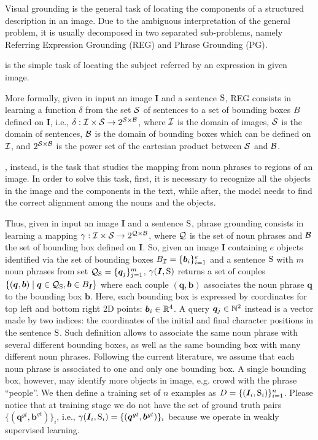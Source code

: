 Visual grounding is the general task of locating the components of a
structured description in an image. Due to the ambiguous
interpretation of the general problem, it is usually decomposed in two
separated sub-problems, namely Referring Expression Grounding (REG)
and Phrase Grounding (PG).

 is the simple task of
locating the subject referred by an expression in given image.

More formally, given in input an image $\bm{I}$ and a sentence
$\mathrm{S}$, REG consists in learning a function $\delta$ from the
set $\mathcal{S}$ of sentences to a set of bounding boxes $B$ defined on
$\bm{I}$, i.e., $\delta: \mathcal{I} \times \mathcal{S} \rightarrow 2^{\mathcal{S}
\times \mathcal{B}}$, where $\mathcal{I}$ is the domain of images, $\mathcal{S}$ is the
domain of sentences, $\mathcal{B}$ is the domain of bounding boxes which can
be defined on $\mathcal{I}$, and $2^{\mathcal{S} \times \mathcal{B}}$ is the power set
of the cartesian product between $\mathcal{S}$ and $\mathcal{B}$.

, instead, is the task that studies the
mapping from noun phrases to regions of an image. In order to solve
this task, first, it is necessary to recognize all the objects in the
image and the components in the text, while after, the model needs to
find the correct alignment among the nouns and the objects.

Thus, given in input an image $\bm{I}$ and a sentence $\mathrm{S}$, phrase
grounding consists in learning a mapping $\gamma : \mathcal{I} \times \mathcal{S}
\rightarrow 2^{\mathcal{Q} \times \mathcal{B}}$, where $\mathcal{Q}$ is the set of noun
phrases and $\mathcal{B}$ the set of bounding box defined on $\bm{I}$. So,
given an image $\bm{I}$ containing $e$ objects identified via the set
of bounding boxes $B_{\mathcal{I}} = \{ \bm{b}_i \}^e_{i=1}$ and a sentence
$\mathrm{S}$ with $m$ noun phrases from set $\mathcal{Q}_{\mathrm{S}} = \{ \bm{q}_j
\}^m_{j=1}$, $\gamma(\bm{I}, \mathrm{S})$ returns a set of couples $\{
(\bm{q}, \bm{b}) \mid \bm{q} \in \mathcal{Q}_{\mathrm{S}}, \bm{b} \in B_{\bm{I}}
\}$ where each couple $(\bm{q}, \bm{b})$ associates the noun phrase
$\bm{q}$ to the bounding box $\bm{b}$. Here, each bounding box is
expressed by coordinates for top left and bottom right 2D points:
$\bm{b}_i \in \mathbb{R}^4$. A query $\bm{q}_j \in \mathbb{N}^2$ instead is a
vector made by two indices: the coordinates of the initial and final
character positions in the sentence $\mathrm{S}$. Such definition allows to
associate the same noun phrase with several different bounding boxes,
as well as the same bounding box with many different noun phrases.
Following the current literature, we assume that each noun phrase is
associated to one and only one bounding box. A single bounding box,
however, may identify more objects in image, e.g. crowd with the
phrase ``people''. We then define a training set of $n$ examples as $D
= \{ (\bm{I}_i, \mathrm{S}_i) \}^n_{i=1}$. Please notice that at training
stage we do not have the set of ground truth pairs $\{ (\bm{q}^{gt},
\bm{b}^{gt}) \}_i$, i.e., $\gamma(\bm{I}_i, \mathrm{S}_i) = \{ (\bm{q}^{gt},
\bm{b}^{gt}) \}_i$ because we operate in weakly supervised learning.

